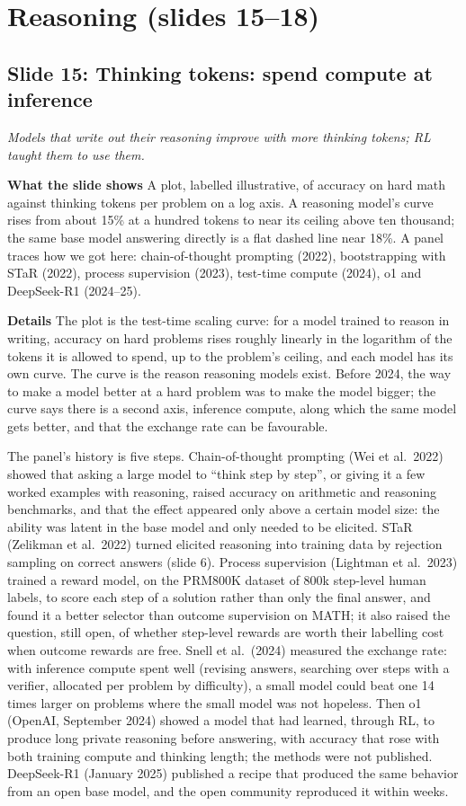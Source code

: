 \documentclass[11pt,letterpaper]{article}
\newcommand{\setstage}[1]{\colorlet{stagec}{#1}}
\newcommand{\slide}[3]{%
  \subsection[Slide #1: #2]{Slide #1: #2}%
  {\color{muted}\itshape #3\par}\medskip}
\newcommand{\para}[1]{\medskip\noindent\textbf{#1}\quad}
\begin{document}
\clearpage
\setstage{posc}
\section{Reasoning (slides 15--18)}

\slide{15}{Thinking tokens: spend compute at inference}{Models that write out their reasoning improve with more thinking tokens; RL taught them to use them.}

\para{What the slide shows} A plot, labelled illustrative, of accuracy on hard math against thinking tokens per problem on a log axis. A reasoning model's curve rises from about 15\% at a hundred tokens to near its ceiling above ten thousand; the same base model answering directly is a flat dashed line near 18\%. A panel traces how we got here: chain-of-thought prompting (2022), bootstrapping with STaR (2022), process supervision (2023), test-time compute (2024), o1 and DeepSeek-R1 (2024--25).

\para{Details} The plot is the test-time scaling curve: for a model trained to reason in writing, accuracy on hard problems rises roughly linearly in the logarithm of the tokens it is allowed to spend, up to the problem's ceiling, and each model has its own curve. The curve is the reason reasoning models exist. Before 2024, the way to make a model better at a hard problem was to make the model bigger; the curve says there is a second axis, inference compute, along which the same model gets better, and that the exchange rate can be favourable.

The panel's history is five steps. Chain-of-thought prompting (Wei et al.\ 2022) showed that asking a large model to ``think step by step'', or giving it a few worked examples with reasoning, raised accuracy on arithmetic and reasoning benchmarks, and that the effect appeared only above a certain model size: the ability was latent in the base model and only needed to be elicited. STaR (Zelikman et al.\ 2022) turned elicited reasoning into training data by rejection sampling on correct answers (slide 6). Process supervision (Lightman et al.\ 2023) trained a reward model, on the PRM800K dataset of 800k step-level human labels, to score each step of a solution rather than only the final answer, and found it a better selector than outcome supervision on MATH; it also raised the question, still open, of whether step-level rewards are worth their labelling cost when outcome rewards are free. Snell et al.\ (2024) measured the exchange rate: with inference compute spent well (revising answers, searching over steps with a verifier, allocated per problem by difficulty), a small model could beat one 14 times larger on problems where the small model was not hopeless. Then o1 (OpenAI, September 2024) showed a model that had learned, through RL, to produce long private reasoning before answering, with accuracy that rose with both training compute and thinking length; the methods were not published. DeepSeek-R1 (January 2025) published a recipe that produced the same behavior from an open base model, and the open community reproduced it within weeks.
\end{document}
